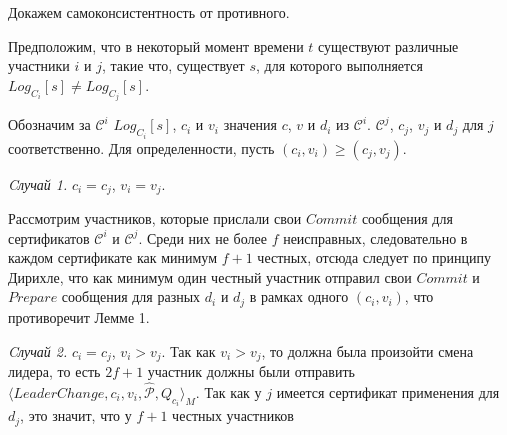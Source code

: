 Докажем самоконсистентность от противного.

Предположим, что в некоторый момент времени $t$ существуют различные участники $i$ и $j$, такие что, существует $s$, для которого выполняется $Log_{C_i}[s] \neq Log_{C_j}[s]$.

Обозначим за $\mathcal{C}^i$ $Log_{C_i}[s]$, $c_i$ и $v_i$ значения $c$, $v$ и $d_i$ из $\mathcal{C}^i$. $\mathcal{C}^j$, $c_j$, $v_j$ и $d_j$ для $j$ соответственно. Для определенности, пусть $(c_i, v_i) \ge (c_j, v_j)$.

\textit{Cлучай 1.} $c_i=c_j$, $v_i = v_j$. 

Рассмотрим участников, которые прислали свои $Commit$ сообщения для сертификатов $\mathcal{C}^i$ и $\mathcal{C}^j$. Среди них не более $f$ неисправных, следовательно в каждом сертификате как минимум $f+1$ честных, отсюда следует по принципу Дирихле, что как минимум один честный участник отправил свои $Commit$ и $Prepare$ сообщения для разных $d_i$ и $d_j$ в рамках одного $(c_i, v_i)$, что противоречит Лемме 1.
\vspace{10pt}

\textit{Cлучай 2.} $c_i=c_j$, $v_i > v_j$. Так как $v_i > v_j$, то должна была произойти смена лидера, то есть $2f+1$ участник должны были отправить $\langle LeaderChange, c_i, v_i,  \hat{\mathcal{P}}, Q_{c_i} \rangle_M$. Так как у $j$ имеется сертификат применения для $d_j$, это значит, что у $f+1$ честных участников
